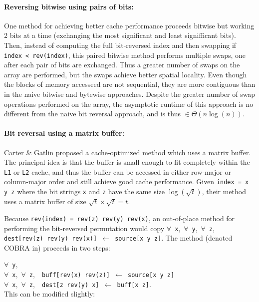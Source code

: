 \documentclass[10pt]{article}
\begin{document}
\paragraph{Reversing bitwise using pairs of bits:}
One method for achieving better cache performance proceeds bitwise but
working 2 bits at a time (exchanging the most significant and least
signifficant bits). Then, instead of computing the full bit-reversed
index and then swapping if {\tt index < rev(index)}, this paired
bitwise method performs multiple swaps, one after each pair of bits
are exchanged\cite{perez:place}. Thus a greater number of swaps on
the array are performed, but the swaps achieve better spatial
locality. Even though the blocks of memory accesseed are not
sequential, they are more contiguous than in the naive bitwise and
bytewise approaches. Despite the greater number of swap operations
performed on the array, the asymptotic runtime of this approach is no
different from the naive bit reversal approach, and is thus $\in
\Theta(n \log(n))$.

\paragraph{Bit reversal using a matrix buffer:}
Carter \& Gatlin proposed a cache-optimized method which uses a matrix
buffer. The principal idea is that the buffer is small enough to fit
completely within the {\tt L1} or {\tt L2} cache, and thus the buffer
can be accessed in either row-major or column-major order and still
achieve good cache performance. Given {\tt index = x y z} where the
bit strings {\tt x} and {\tt z} have the same size $\log(\sqrt{t})$,
their method uses a matrix buffer of size $\sqrt{t} \times \sqrt{t} =
t$\cite{carter:towards}.

Because {\tt rev(index) = rev(z) rev(y) rev(x)}, an out-of-place
method for performing the bit-reversed permutation would copy
$\forall$~{\tt x},~$\forall$~{\tt y},~$\forall$~{\tt z},~{\tt
  dest[rev(z)~rev(y)~rev(x)]~$\gets$~source[x~y~z]}. The method
(denoted COBRA in\cite{carter:towards}) proceeds in two steps: 

\noindent $\forall$~{\tt y},\\
\mbox{} \quad $\forall$~{\tt x},~$\forall$~{\tt z},~{\tt
  buff[rev(x)~rev(z)]~$\gets$~source[x~y~z]}\\
\mbox{} \quad $\forall$~{\tt x},~$\forall$~{\tt z},~{\tt
  dest[z~rev(y)~x]~$\gets$~buff[x~z]}.\\

\noindent This can be modified slightly:
\end{document}
